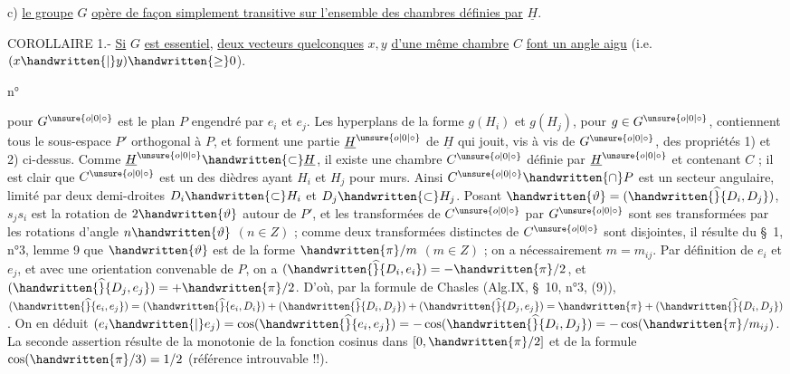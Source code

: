 c) \uline{le groupe} $G$ \uline{opère de façon simplement transitive sur l'ensemble des chambres définies par} $\underline{H}$.

COROLLAIRE 1.- \uline{Si} $G$ \uline{est essentiel}, \uline{deux vecteurs quelconques} $x,y$ \uline{d'une même chambre} $C$ \uline{font un angle aigu} (i.e. $(x\handwritten{|}y)\handwritten{\geq}0$).
\begin{flushright}n°\end{flushright}
pour $G^{\unsure{o|0|\circ}}$ est le plan $P$ engendré par $e_i$ et $e_j$. Les hyperplans de la forme $g(H_i)$ et $g(H_j)$, pour $g\in G^{\unsure{o|0|\circ}}$, contiennent tous le sous-espace $P'$ orthogonal à $P$, et forment une partie $\underline{H}^{\unsure{o|0|\circ}}$ de $\underline{H}$ qui jouit, vis à vis de $G^{\unsure{o|0|\circ}}$, des propriétés 1) et 2) ci-dessus. Comme $\underline{H}^{\unsure{o|0|\circ}}\handwritten{\subset}\underline{H}$, il existe une chambre $C^{\unsure{o|0|\circ}}$ définie par $\underline{H}^{\unsure{o|0|\circ}}$ et contenant $C$ ; il est clair que $C^{\unsure{o|0|\circ}}$ est un des dièdres ayant $H_i$ et $H_j$ pour murs. Ainsi $C^{\unsure{o|0|\circ}}\handwritten{\cap}P$ est un secteur angulaire, limité par deux demi-droites $D_i\handwritten{\subset}H_i$ et $D_j\handwritten{\subset}H_j$. Posant $\handwritten{\vartheta}=(\handwritten{\widehat}{D_i,D_j})$, $s_j s_i$ est la rotation de $2\handwritten{\vartheta}$ autour de $P'$, et les transformées de $C^{\unsure{o|0|\circ}}$ par $G^{\unsure{o|0|\circ}}$ sont ses transformées par les rotations d'angle $n\handwritten{\vartheta}$ $(n\in Z)$ ; comme deux transformées distinctes de $C^{\unsure{o|0|\circ}}$ sont disjointes, il résulte du \S\ 1, n°3, lemme 9 que $\handwritten{\vartheta}$ est de la forme $\handwritten{\pi}/m$ $(m\in Z)$ ; on a nécessairement $m=m_{ij}$. Par définition de $e_i$ et $e_j$, et avec une orientation convenable de $P$, on a $(\handwritten{\widehat}{D_i,e_i})=-\handwritten{\pi}/2$, et $(\handwritten{\widehat}{D_j,e_j})=+\handwritten{\pi}/2$. D'où, par la formule de Chasles (Alg.IX, \S\ 10, n°3, (9)), $(\handwritten{\widehat}{e_i,e_j})=(\handwritten{\widehat}{e_i,D_i})+(\handwritten{\widehat}{D_i,D_j})+(\handwritten{\widehat}{D_j,e_j})=\handwritten{\pi}+(\handwritten{\widehat}{D_i,D_j})$. On en déduit $(e_i\handwritten{|}e_j)=\cos(\handwritten{\widehat}{e_i,e_j})=-\cos(\handwritten{\widehat}{D_i,D_j})=-\cos(\handwritten{\pi}/m_{ij})$. La seconde assertion résulte de la monotonie de la fonction cosinus dans $[0,\handwritten{\pi}/2]$ et de la formule $\cos(\handwritten{\pi}/3)=1/2$ (référence introuvable !!).

